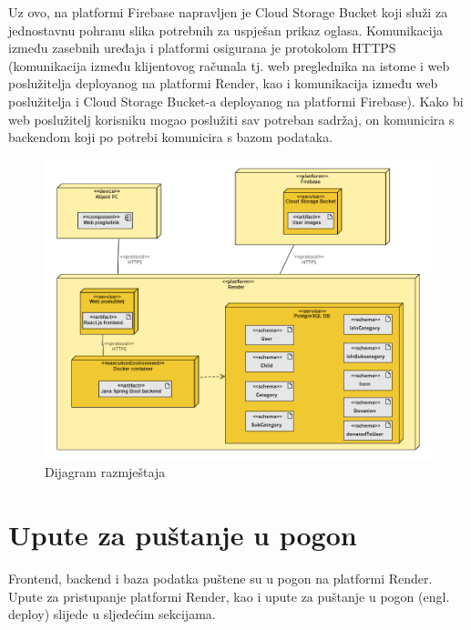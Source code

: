                 Uz ovo, na platformi Firebase napravljen je Cloud Storage Bucket koji služi za jednostavnu pohranu slika potrebnih za uspješan prikaz oglasa. Komunikacija između zasebnih uređaja i platformi osigurana je protokolom HTTPS (komunikacija između klijentovog računala tj. web preglednika na istome i web poslužitelja deployanog na platformi Render, kao i komunikacija između web poslužitelja i Cloud Storage Bucket-a deployanog na platformi Firebase). Kako bi web poslužitelj korisniku mogao poslužiti sav potreban sadržaj, on komunicira s backendom koji po potrebi komunicira s bazom podataka.

                \begin{figure}[H]
				\includegraphics[width=\textwidth,height=0.8\textheight]{dijagrami/Dijagram razmjestajav2.png}
				\centering
				\caption{Dijagram razmještaja}
				\label{fig:DeploymentDiagram}
			\end{figure}
			
			\eject 
		
		\section{Upute za puštanje u pogon}
		
                Frontend, backend i baza podatka puštene su u pogon na platformi Render. Upute za pristupanje platformi Render, kao i upute za puštanje u pogon (engl. deploy) slijede u sljedećim sekcijama.
          
